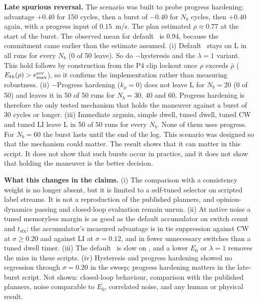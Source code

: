 \noindent\textbf{Late spurious reversal.} The scenario was built to probe progress hardening: advantage $+0.40$ for 150 cycles, then a burst of $-0.40$ for $N_b$ cycles, then $+0.40$ again, with a progress input of $0.15$~m/s. The plan estimated $\rho\approx0.77$ at the start of the burst. The observed mean for default \sname\ is 0.94, because the commitment came earlier than the estimate assumed. (i) Default \sname\ stays on L in all runs for every $N_b$ (0 of 50 leave). So do $-$hysteresis and the $\lambda=1$ variant. This hold follows by construction from the P4 clip lockout once $\rho$ exceeds $\bar\rho$ ($E_{\text{th}}(\rho)>e^{\text{rev}}_{\max}$), so it confirms the implementation rather than measuring robustness. (ii) $-$Progress hardening ($k_\rho=0$) does not leave L for $N_b=20$ (0 of 50) and leaves it in 50 of 50 runs for $N_b=30$, 40 and 60. Progress hardening is therefore the only tested mechanism that holds the maneuver against a burst of 30 cycles or longer. (iii) Immediate argmin, simple dwell, tuned dwell, tuned CW and tuned LI leave L in 50 of 50 runs for every $N_b$. None of them uses progress. For $N_b=60$ the burst lasts until the end of the log. This scenario was designed so that the mechanism could matter. The result shows that it can matter in this script. It does not show that such bursts occur in practice, and it does not show that holding the maneuver is the better decision.

\noindent\textbf{What this changes in the claims.} (i) The comparison with a consistency weight is no longer absent, but it is limited to a self-tuned selector on scripted label streams. It is not a reproduction of the published planners, and opinion-dynamics passing and closed-loop evaluation remain unrun. (ii) At native noise a tuned memoryless margin is as good as the default accumulator on switch count and $t_{\text{sfx}}$; the accumulator's measured advantage is in tie suppression against CW at $\sigma\ge0.20$ and against LI at $\sigma=0.12$, and in fewer unnecessary switches than a tuned dwell timer. (iii) The default \sname\ is slow on , and a lower $E_0$ or $\lambda=1$ removes the miss in these scripts. (iv) Hysteresis and progress hardening showed no regression through $\sigma=0.20$ in the sweep; progress hardening matters in the late-burst script. Not shown: closed-loop behaviour, comparison with the published planners, noise comparable to $E_0$, correlated noise, and any human or physical result.

